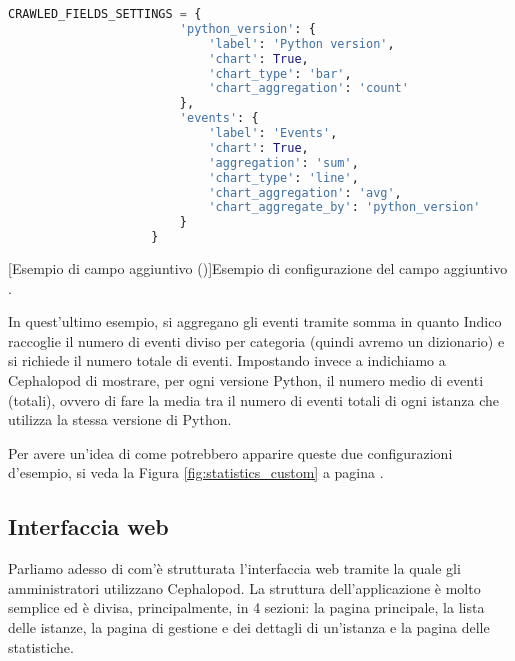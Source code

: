             \begin{center}
                \begin{lstlisting}[language=python, gobble=18]
                    CRAWLED_FIELDS_SETTINGS = {
                        'python_version': {
                            'label': 'Python version',
                            'chart': True,
                            'chart_type': 'bar',
                            'chart_aggregation': 'count'
                        },
                        'events': {
                            'label': 'Events',
                            'chart': True,
                            'aggregation': 'sum',
                            'chart_type': 'line',
                            'chart_aggregation': 'avg',
                            'chart_aggregate_by': 'python_version'
                        }
                    }
                \end{lstlisting}
                \captionsetup{textformat=empty,labelformat=empty} \vspace{-2em}
                [Esempio di campo aggiuntivo ()]{Esempio di configurazione del campo aggiuntivo .}
            \end{center}
            
            In quest'ultimo esempio, si aggregano gli eventi tramite somma in quanto Indico raccoglie il numero di eventi diviso per categoria (quindi avremo un dizionario) e si richiede il numero totale di eventi. Impostando invece  a  indichiamo a Cephalopod di mostrare, per ogni versione Python, il numero medio di eventi (totali), ovvero di fare la media tra il numero di eventi totali di ogni istanza che utilizza la stessa versione di Python.
            
            Per avere un'idea di come potrebbero apparire queste due configurazioni d'esempio, si veda la Figura \ref{fig:statistics_custom} a pagina \pageref{fig:statistics_custom}.
    
        \subsection{Interfaccia web} \label{subsec:it;cp;interfaccia_web}
        
            Parliamo adesso di com'è strutturata l'interfaccia web tramite la quale gli amministratori utilizzano Cephalopod. La struttura dell'applicazione è molto semplice ed è divisa, principalmente, in 4 sezioni: la pagina principale, la lista delle istanze, la pagina di gestione e dei dettagli di un'istanza e la pagina delle statistiche.
            
